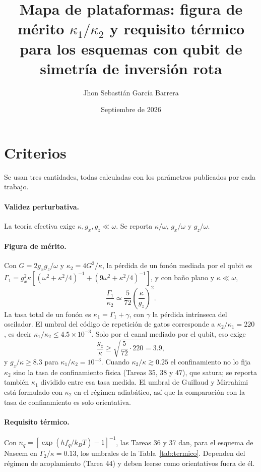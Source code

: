 \documentclass[11pt]{report}
\title{Mapa de plataformas: figura de m\'erito $\kappa_{1}/\kappa_{2}$ y requisito t\'ermico\\ para los esquemas con qubit de simetr\'ia de inversi\'on rota}
\author{Jhon Sebasti\'an Garc\'ia Barrera}
\date{Septiembre de 2026}
\begin{document}
\maketitle

\section{Criterios}

Se usan tres cantidades, todas calculadas con los par\'ametros publicados por cada trabajo.

\paragraph{Validez perturbativa.} La teor\'ia efectiva exige $\kappa,g_{x},g_{z}\ll\omega$. Se reporta $\kappa/\omega$, $g_{x}/\omega$ y $g_{z}/\omega$.

\paragraph{Figura de m\'erito.} Con $G=2g_{x}g_{z}/\omega$ y $\kappa_{2}=4G^{2}/\kappa$, la p\'erdida de un fon\'on mediada por el qubit es $\Gamma_{1}=g_{x}^{2}\kappa[(\omega^{2}+\kappa^{2}/4)^{-1}+(9\omega^{2}+\kappa^{2}/4)^{-1}]$, y con baño plano y $\kappa\ll\omega$,
\begin{equation}
\frac{\Gamma_{1}}{\kappa_{2}}\simeq\frac{5}{72}\left(\frac{\kappa}{g_{z}}\right)^{2}.
\end{equation}
La tasa total de un fon\'on es $\kappa_{1}=\Gamma_{1}+\gamma$, con $\gamma$ la p\'erdida intr\'inseca del oscilador. El umbral del c\'odigo de repetici\'on de gatos corresponde a $\kappa_{2}/\kappa_{1}=220$ \cite{GuillaudMirrahimi2021}, es decir $\kappa_{1}/\kappa_{2}\leq4.5\times10^{-3}$. Solo por el canal mediado por el qubit, eso exige
\begin{equation}
\boxed{\frac{g_{z}}{\kappa}\geq\sqrt{\frac{5}{72}\cdot220}=3.9},
\end{equation}
y $g_{z}/\kappa\geq8.3$ para $\kappa_{1}/\kappa_{2}=10^{-3}$. Cuando $\kappa_{2}/\kappa\gtrsim0.25$ el confinamiento no lo fija $\kappa_{2}$ sino la tasa de confinamiento f\'isica (Tareas 35, 38 y 47), que satura; se reporta tambi\'en $\kappa_{1}$ dividido entre esa tasa medida. El umbral de Guillaud y Mirrahimi est\'a formulado con $\kappa_{2}$ en el r\'egimen adiab\'atico, as\'i que la comparaci\'on con la tasa de confinamiento es solo orientativa.

\paragraph{Requisito t\'ermico.} Con $n_{q}=[\exp(hf_{q}/k_{B}T)-1]^{-1}$, las Tareas 36 y 37 dan, para el esquema de Naseem en $\Gamma_{2}/\kappa=0.13$, los umbrales de la Tabla~\ref{tab:termico}. Dependen del r\'egimen de acoplamiento (Tarea 44) y deben leerse como orientativos fuera de \'el.
\end{document}
